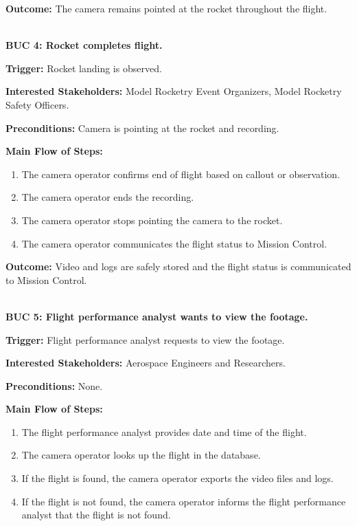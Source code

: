 \documentclass[12pt]{article}
\begin{document}
\textbf{Outcome:} The camera remains pointed at the rocket throughout the flight.

~\\

\textbf{BUC 4: Rocket completes flight.}

\textbf{Trigger:} Rocket landing is observed.

\textbf{Interested Stakeholders:} Model Rocketry Event Organizers, Model Rocketry Safety Officers.

\textbf{Preconditions:} Camera is pointing at the rocket and recording.

\textbf{Main Flow of Steps:}
\begin{enumerate}
  \item The camera operator confirms end of flight based on callout or observation.
  \item The camera operator ends the recording.
  \item The camera operator stops pointing the camera to the rocket.
  \item The camera operator communicates the flight status to Mission Control.
\end{enumerate}

\textbf{Outcome:} Video and logs are safely stored and the flight status is communicated to Mission Control.

~\\

\textbf{BUC 5: Flight performance analyst wants to view the footage.}

\textbf{Trigger:} Flight performance analyst requests to view the footage.

\textbf{Interested Stakeholders:} Aerospace Engineers and Researchers.

\textbf{Preconditions:} None.

\textbf{Main Flow of Steps:}
\begin{enumerate}
  \item The flight performance analyst provides date and time of the flight.
  \item The camera operator looks up the flight in the database.
  \item If the flight is found, the camera operator exports the video files and logs.
  \item If the flight is not found, the camera operator informs the flight performance
        analyst that the flight is not found.
\end{enumerate}
\end{document}
